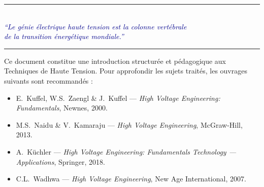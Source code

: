 \documentclass[12pt, a4paper, twoside]{report}
\begin{document}
\vspace{1cm}
\begin{center}
\textcolor{accent}{\rule{0.8\textwidth}{1.5pt}}\\[8pt]
{\large\textit{\textcolor{darkblue}{``Le génie électrique haute tension est la colonne vertébrale}}}\\
{\large\textit{\textcolor{darkblue}{de la transition énergétique mondiale.''}}}\\[8pt]
\textcolor{accent}{\rule{0.8\textwidth}{1.5pt}}
\end{center}

\vspace{1.5cm}
\noindent
\small
\textcolor{textmed}{
Ce document constitue une introduction structurée et pédagogique aux Techniques de
Haute Tension. Pour approfondir les sujets traités, les ouvrages suivants sont recommandés :
\begin{itemize}
  \item E.\ Kuffel, W.S.\ Zaengl \& J.\ Kuffel — \textit{High Voltage Engineering: Fundamentals}, Newnes, 2000.
  \item M.S.\ Naidu \& V.\ Kamaraju — \textit{High Voltage Engineering}, McGraw-Hill, 2013.
  \item A.\ Küchler — \textit{High Voltage Engineering: Fundamentals Technology — Applications}, Springer, 2018.
  \item C.L.\ Wadhwa — \textit{High Voltage Engineering}, New Age International, 2007.
\end{itemize}
}
\end{document}
